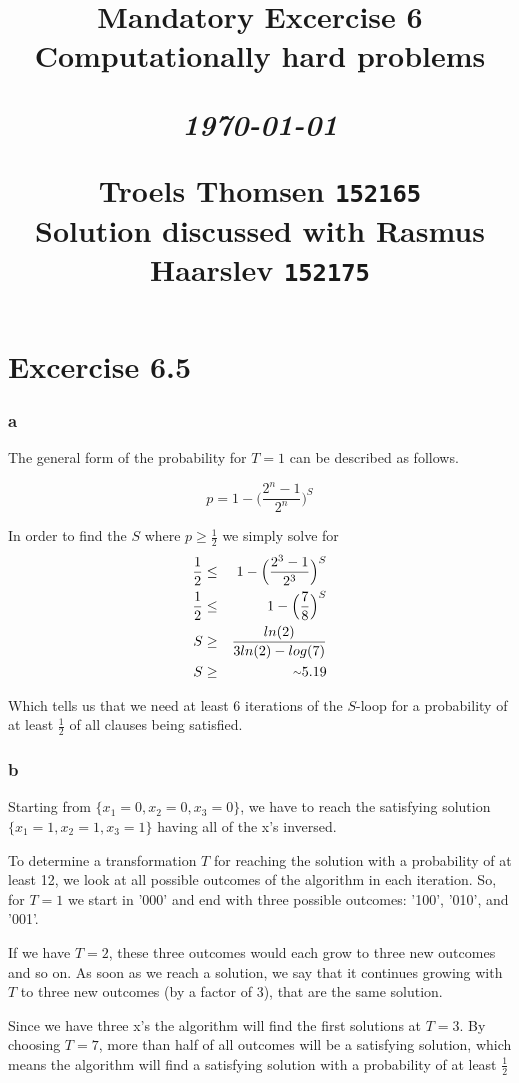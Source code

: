 \documentclass[12pt]{article}
\title{
  \vspace{4cm}
  \begin{flushleft}
  \Large{\textbf{Mandatory Excercise 6}} \\
  \large{Computationally hard problems}
  \end{flushleft}
  \vspace{0cm}
  \begin{flushleft}
  \small
  \textit{\today}
  \end{flushleft}
  \vspace{12cm}
  \begin{flushleft}
  \small
  Troels Thomsen \texttt{152165} \\
  Solution discussed with Rasmus Haarslev \texttt{152175}
  \end{flushleft}
}
\date{
}
\begin{document}
\clearpage
{}
\thispagestyle{empty}
\maketitle

\newpage


\section{Excercise 6.5}

\subsubsection{a}
\label{subs:a}

The general form of the probability for $T = 1$ can be described as follows.

\begin{equation}
    p = 1 - \Big(\frac{2^n-1}{2^n}\Big)^S
\end{equation}

In order to find the $S$ where $p \geq \frac{1}{2}$ we simply solve for
\begin{eqnarray}
    \frac{1}{2} & \leq & 1 - \Big(\frac{2^3-1}{2^3}\Big)^S \\
    \frac{1}{2} & \leq & 1 - \Big(\frac{7}{8}\Big)^S \\
    S & \geq & \frac{ln(2)}{3 ln(2) - log(7)} \\
    S & \geq & {\raise.17ex\hbox{$\scriptstyle\mathtt{\sim}$}} 5.19
\end{eqnarray}

Which tells us that we need at least 6 iterations of the $S$-loop for a probability of at least $\frac{1}{2}$ of all clauses being satisfied.

\subsubsection{b}
\label{subs:b}

Starting from $\{x_1 = 0, x_2 = 0, x_3 = 0\}$, we have to reach the satisfying solution $\{x_1 = 1, x_2 = 1, x_3 = 1\}$ having all of the x’s inversed.

To determine a transformation $T$ for reaching the solution with a probability of at least 12, we look at all possible outcomes of the algorithm in each iteration. So, for $T = 1$ we start in ’000’ and end with three possible outcomes: ’100’, ’010’, and ’001’.

If we have $T = 2$, these three outcomes would each grow to three new outcomes and so on. As soon as we reach a solution, we say that it continues growing with $T$ to three new outcomes (by a factor of 3), that are the same solution.

Since we have three x’s the algorithm will find the first solutions at $T = 3$. By choosing $T = 7$, more than half of all outcomes will be a satisfying solution, which means the algorithm will find a satisfying solution with a probability of at least $\frac{1}{2}$
\end{document}
